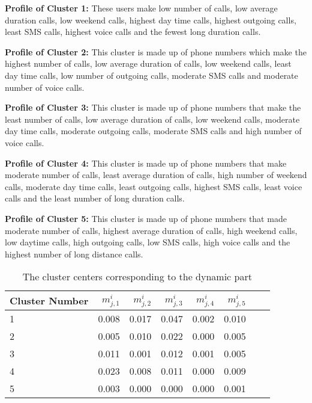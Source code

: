 \documentclass[oribibl]{llncs}
\begin{document}
\noindent
{\bf Profile of Cluster 1:}
These users make low number of calls, low average duration 
calls, low weekend calls, highest day time calls, highest
 outgoing calls, least SMS calls, highest voice calls and 
the fewest long duration calls.

\noindent
{\bf Profile of Cluster 2:}
This cluster is made up of phone numbers which make the highest
number of calls, low average duration of calls, low
weekend calls, least day time calls, low number of outgoing
calls, moderate SMS calls and moderate number of voice calls.

\noindent
{\bf Profile of Cluster 3:}
This cluster is made up of phone numbers that make the least 
number of calls, low average duration of calls, low weekend 
calls, moderate day time calls, moderate outgoing calls, 
moderate SMS calls and high number of voice calls.

\noindent
{\bf Profile of Cluster 4:}
This cluster is made up of phone numbers that make moderate 
number of calls, least average duration of calls, high number
of weekend calls, moderate day time calls, least outgoing calls, highest SMS calls, least voice calls and the least number of 
long duration calls.

\noindent
{\bf Profile of Cluster 5:}
This cluster is made up of phone numbers that made moderate 
number of calls, highest average duration of calls, high weekend
calls, low daytime calls, high outgoing calls, low SMS calls, 
high voice calls and the highest number of long distance calls.

\begin{table}[H]
\begin{center}
\begin{tabular}{|l|r|r|r|r|r|r|r|}
\hline
Cluster Number&$m_{j,1}^i$&$m_{j,2}^i$&$m_{j,3}^i$&$m_{j,4}^i$&$m_{j,5}^i$\\
\hline
1&0.008&0.017&0.047&0.002&0.010\\
\hline
2&0.005&0.010&0.022&0.000&0.005\\
\hline
3&0.011&0.001&0.012&0.001&0.005\\
\hline
4&0.023&0.008&0.011&0.000&0.009\\
\hline
5&0.003&0.000&0.000&0.000&0.001\\
\hline
\end{tabular}
\end{center}
\caption{The cluster centers corresponding to the dynamic part}
\label{table:dynamicclustercenters}
\end{table}
\end{document}
